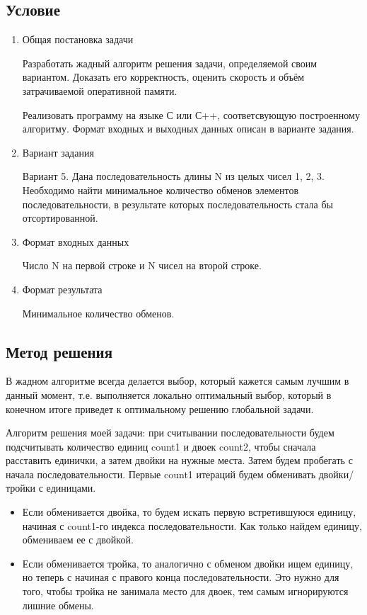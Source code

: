 \documentclass[12pt]{article}
\begin{document}
\subsection*{Условие}
\begin{enumerate}
\item Общая постановка задачи 

Разработать жадный алгоритм решения задачи, определяемой своим вариантом. Доказать его корректность, оценить скорость и объём затрачиваемой оперативной памяти.

Реализовать программу на языке С или С++, соответсвующую построенному алгоритму. Формат входных и выходных данных описан в варианте задания.

\item Вариант задания 

Вариант 5. Дана последовательность длины N из целых чисел 1, 2, 3. Необходимо найти минимальное количество обменов элементов последовательности, в результате которых последовательность стала бы отсортированной.

\item Формат входных данных

Число N на первой строке и N чисел на второй строке.

\item Формат результата

Минимальное количество обменов.

\end{enumerate}

\subsection*{Метод решения}

В жадном алгоритме всегда делается выбор, который кажется самым лучшим в данный момент, т.е. выполняется локально оптимальный выбор, который в конечном итоге приведет к оптимальному решению глобальной задачи.

Алгоритм решения моей задачи: при считывании последовательности будем подсчитывать количество единиц count1 и двоек count2, чтобы сначала расставить единички, а затем двойки на нужные места. Затем будем пробегать с начала последовательности. Первые count1 итераций будем обменивать двойки/тройки с единицами. 

\begin{itemize}
    \item Если обменивается двойка, то будем искать первую встретившуюся единицу, начиная с count1-го индекса последовательности. Как только найдем единицу, обмениваем ее с двойкой. 
    \item Если обменивается тройка, то аналогично с обменом двойки ищем единицу, но теперь с начиная с правого конца последовательности. Это нужно для того, чтобы тройка не занимала место для двоек, тем самым игнорируются лишние обмены.
\end{itemize}
\end{document}
